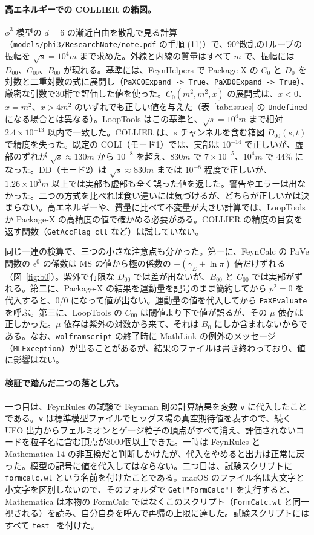 \documentclass[a4paper,10pt]{ltjsarticle}
\newcommand{\bq}{\textasciigrave}
\begin{document}
\paragraph{高エネルギーでの COLLIER の箱図。}$\phi^3$ 模型の $d=6$ の漸近自由を散乱で見る計算（\nolinkurl{models/phi3/ResearchNote/note.pdf} の手順 (11)）で、90°散乱の1ループの振幅を $\sqrt s=10^4m$ まで求めた。外線と内線の質量はすべて $m$ で、振幅には $D_{00}$、$C_{00}$、$B_{00}$ が現れる。基準には、FeynHelpers で Package-X の $C_0$ と $D_0$ を対数と二重対数の式に展開し（\texttt{PaXC0Expand -> True}、\texttt{PaXD0Expand -> True}）、厳密な引数で30桁で評価した値を使った。$C_0(m^2,m^2,x)$ の展開式は、$x<0$、$x=m^2$、$x>4m^2$ のいずれでも正しい値を与えた（表~\ref{tab:issues} の \texttt{Undefined} になる場合とは異なる）。LoopTools はこの基準と、$\sqrt s=10^4m$ まで相対 $2.4\times10^{-13}$ 以内で一致した。COLLIER は、$s$ チャンネルを含む箱図 $D_{00}(s,t)$ で精度を失った。既定の COLI（モード1）では、実部は $10^{-14}$ で正しいが、虚部のずれが $\sqrt s\approx130m$ から $10^{-8}$ を超え、$830m$ で $7\times10^{-5}$、$10^4m$ で $44\%$ になった。DD（モード2）は $\sqrt s\approx830m$ までは $10^{-8}$ 程度で正しいが、$1.26\times10^3m$ 以上では実部も虚部も全く誤った値を返した。警告やエラーは出なかった。二つの方式を比べれば食い違いには気づけるが、どちらが正しいかは決まらない。高エネルギーや、質量に比べて不変量が大きい計算では、LoopTools か Package-X の高精度の値で確かめる必要がある。COLLIER の精度の目安を返す関数（\texttt{GetAccFlag\_cll} など）は試していない。

同じ一連の検算で、三つの小さな注意点も分かった。第一に、FeynCalc の PaVe 関数の $\epsilon^0$ の係数は $\overline{\mathrm{MS}}$ の値から極の係数の $-(\gamma_E+\ln\pi)$ 倍だけずれる（図~\ref{fig:b0}）。紫外で有限な $D_{00}$ では差が出ないが、$B_{00}$ と $C_{00}$ では実部がずれる。第二に、Package-X の結果を運動量を記号のまま簡約してから $p^2=0$ を代入すると、$0/0$ になって値が出ない。運動量の値を代入してから \texttt{PaXEvaluate} を呼ぶ。第三に、LoopTools の $C_{00}$ は閾値より下で値が誤るが、その $\mu$ 依存は正しかった。$\mu$ 依存は紫外の対数から来て、それは $B_0$ にしか含まれないからである。なお、\texttt{wolframscript} の終了時に MathLink の例外のメッセージ（\texttt{MLException}）が出ることがあるが、結果のファイルは書き終わっており、値に影響はない。

\paragraph{検証で踏んだ二つの落とし穴。}一つ目は、FeynRules の試験で Feynman 則の計算結果を変数 \texttt{v} に代入したことである。\texttt{v} は標準模型ファイルでヒッグス場の真空期待値を表すので、続く UFO 出力からフェルミオンとゲージ粒子の頂点がすべて消え、評価されないコードを粒子名に含む頂点が3000個以上できた。一時は FeynRules と Mathematica 14 の非互換だと判断しかけたが、代入をやめると出力は正常に戻った。模型の記号に値を代入してはならない。二つ目は、試験スクリプトに \texttt{formcalc.wl} という名前を付けたことである。macOS のファイル名は大文字と小文字を区別しないので、そのフォルダで \texttt{Get["FormCalc\bq"]} を実行すると、Mathematica は本物の FormCalc ではなくこのスクリプト（\texttt{FormCalc.wl} と同一視される）を読み、自分自身を呼んで再帰の上限に達した。試験スクリプトにはすべて \texttt{test\_} を付けた。
\end{document}
